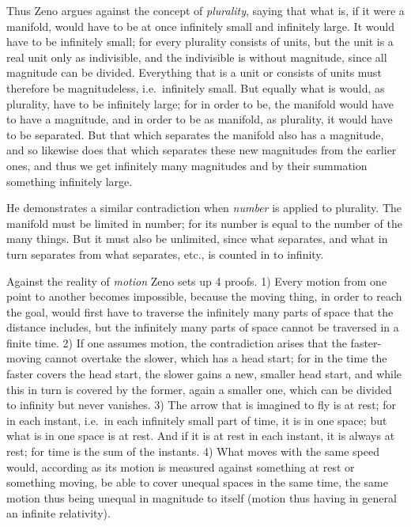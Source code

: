 Thus Zeno argues against the concept of \emph{plurality},
saying that what is, if it were a manifold,
would have to be at once infinitely small and infinitely large.
It would have to be infinitely small; for every plurality consists
of units, but the unit is a real unit only as indivisible,
and the indivisible is without magnitude, since all magnitude can be divided.
Everything that is a unit or consists of units must therefore
be magnitudeless, i.e.\ infinitely small. But equally what is
would, as plurality, have to be infinitely large; for in order to be,
the manifold would have to have a magnitude, and in order to be as
manifold, as plurality, it would have to be separated. But that
which separates the manifold also has a magnitude, and so likewise does that
which separates these new magnitudes from the earlier ones,
and thus we get infinitely many magnitudes and by their
summation something infinitely large.

He demonstrates a similar contradiction when \emph{number} is applied to plurality. The manifold must be limited in
number; for its number is equal to the number of the many things. But it
must also be unlimited, since what separates, and what
in turn separates from what separates, etc., is counted in to
infinity.

Against the reality of \emph{motion} Zeno sets up 4 proofs.
1) Every motion from one point to another becomes impossible,
because the moving thing, in order to reach the goal, would first have to traverse the infinitely many parts of space that the distance includes, but
the infinitely many parts of space cannot be traversed in a
finite time. 2) If one assumes motion, the contradiction arises that the faster-moving cannot overtake the slower, which has a head start; for in the time the faster
covers the head start, the slower gains a new, smaller
head start, and while this in turn is covered by the former, again
a smaller one, which can be divided to infinity but never vanishes. 3) The arrow that is imagined to fly is at rest; for in each
instant, i.e.\ in each infinitely small part of time, it is in one space;
but what is in one space is at rest. And if it is at rest in each
instant, it is always at rest; for time is the sum of
the instants. 4) What moves with the same speed would,
according as its motion is measured against something at rest or
something moving, be able to cover unequal spaces in the same time, the
same motion thus being unequal in magnitude to itself (motion thus having in general an infinite relativity).

